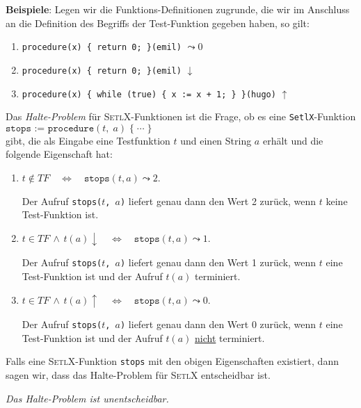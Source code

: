 \noindent
\textbf{Beispiele}: Legen wir die Funktions-Definitionen zugrunde, die wir im Anschluss an
die Definition des Begriffs der Test-Funktion gegeben haben, so gilt:
\begin{enumerate}
\item {\tt procedure(x) \{ return 0; \}(emil)} $\leadsto 0$
\item {\tt procedure(x) \{ return 0; \}(emil)} $\downarrow$
\item {\tt procedure(x) \{ while (true) \{ x := x + 1; \} \}(hugo)} $\uparrow$
\end{enumerate} 

\noindent
Das \emph{Halte-Problem} für
\textsc{SetlX}-Funktionen ist die Frage, ob es eine \texttt{SetlX}-Funktion \\[0.1cm] 
\hspace*{1.3cm} 
$\texttt{stops := procedure}(t,\;a)\; \{\;\cdots\;\}$ \\[0.1cm]
gibt, die als Eingabe eine Testfunktion $t$ und einen String $a$ erhält und die folgende
Eigenschaft hat:
\begin{enumerate}
\item $t \not\in T\!F \quad\Leftrightarrow\quad \mathtt{stops}(t, a) \leadsto 2$.

      Der Aufruf \texttt{stops($t$, $a$)} liefert genau dann den Wert 2 zurück, 
      wenn $t$ keine Test-Funktion ist.

\item $t \in T\!F \,\wedge\, t(a)\downarrow \quad\Leftrightarrow\quad
       \mathtt{stops}(t, a) \leadsto 1$.

      Der Aufruf \texttt{stops($t$, $a$)} liefert genau dann den Wert 1 zurück,
      wenn $t$ eine Test-Funktion ist und der Aufruf $t(a)$ terminiert.

\item $t \in T\!F \,\wedge\, t(a)\uparrow \quad\Leftrightarrow\quad
       \mathtt{stops}(t, a) \leadsto 0$.

      Der Aufruf \texttt{stops($t$, $a$)} liefert genau dann den Wert 0 zurück,
      wenn $t$ eine Test-Funktion ist und der Aufruf $t(a)$ \underline{nicht} terminiert.
\end{enumerate}
Falls eine \textsc{SetlX}-Funktion \texttt{stops} mit den obigen Eigenschaften existiert, dann
sagen wir, dass das Halte-Problem für \textsc{SetlX} entscheidbar ist.

\begin{Theorem}
{\em
  Das Halte-Problem ist unentscheidbar.
} 
\end{Theorem}

